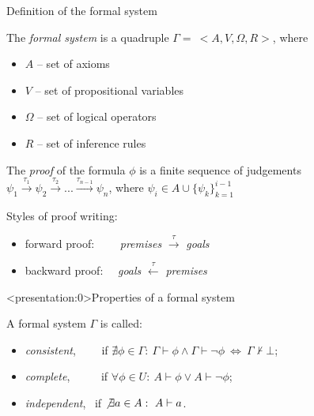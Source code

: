 \documentclass[aspectratio=169, 12pt, fleqn]{beamer}
\begin{document}
\begin{frame}{Definition of the formal system}

The \textit{formal system} is a quadruple $\Gamma = \ <A, V, \Omega, R>$, where
\begin{itemize}
  \item $A$ -- set of axioms
  \item $V$ -- set of propositional variables
  \item $\Omega$ -- set of logical operators
  \item $R$ -- set of inference rules
\end{itemize} 

\vspace{15pt}
The \textit{proof} of the formula $\phi$ is a finite sequence of judgements 
\newline
$\psi_1 \xrightarrow{\tau_1} \psi_2 \xrightarrow{\tau_2} ... \xrightarrow{\tau_{n-1}} \psi_n$, where $\psi_i \in A \cup \{ \psi_k \}_{k=1}^{i-1}$

\vspace{15pt}
Styles of proof writing:
\begin{itemize}
  \item forward proof: \ \ \ \ \textit{premises} $\xrightarrow{\tau}$ \textit{goals}
  \item backward proof: \ \ \textit{goals} $\xleftarrow{\tau}$ \textit{premises}
\end{itemize}
\end{frame}


\begin{frame}<presentation:0>{Properties of a formal system}

A formal system $\Gamma$ is called:
\begin{itemize}
\item  \textit{consistent}, \ \ \ \ if $\nexists \phi \in \Gamma: \ \Gamma \vdash \phi \land  \Gamma \vdash \neg \phi  \ \Leftrightarrow \ \Gamma \nvdash \bot$; 
\\ \vspace{3pt}
\item \textit{complete}, \ \ \ \ \ if $\forall \phi \in U: \ A \vdash \phi \lor A \vdash \neg \phi$;
\\ \vspace{3pt}
\item \textit{independent}, \ if $\not \exists a \in A: \ A \vdash a$.
\end{itemize}
\end{frame}
\end{document}
